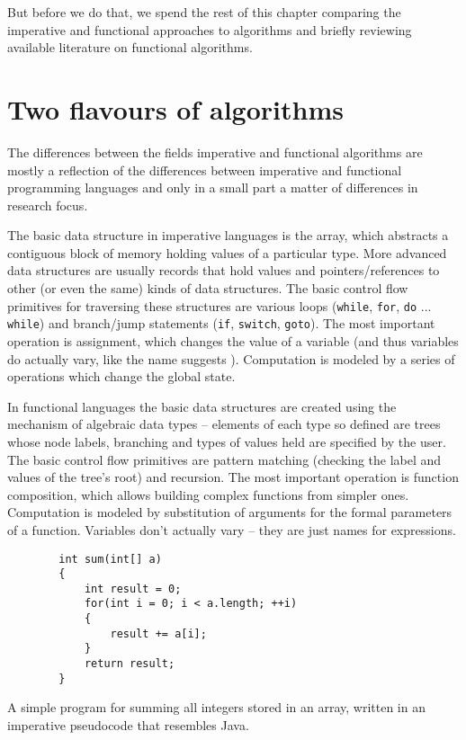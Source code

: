 \documentclass[declaration,mgr,english,shortabstract]{iithesis}
\newcommand{\m}[1]{\texttt{#1}}
\begin{document}
But before we do that, we spend the rest of this chapter comparing the imperative and functional approaches to algorithms and briefly reviewing available literature on functional algorithms.

\section{Two flavours of algorithms} \label{impfun}

The differences between the fields imperative and functional algorithms are mostly a reflection of the differences between imperative and functional programming languages and only in a small part a matter of differences in research focus.

The basic data structure in imperative languages is the array, which abstracts a contiguous block of memory holding values of a particular type. More advanced data structures are usually records that hold values and pointers/references to other (or even the same) kinds of data structures. The basic control flow primitives for traversing these structures are various loops (\m{while}, \m{for}, \m{do} ... \m{while}) and branch/jump statements (\m{if}, \m{switch}, \m{goto}). The most important operation is assignment, which changes the value of a variable (and thus variables do actually vary, like the name suggests \cite{WordsMatter}). Computation is modeled by a series of operations which change the global state.

In functional languages the basic data structures are created using the mechanism of algebraic data types -- elements of each type so defined are trees whose node labels, branching and types of values held are specified by the user. The basic control flow primitives are pattern matching (checking the label and values of the tree's root) and recursion. The most important operation is function composition, which allows building complex functions from simpler ones. Computation is modeled by substitution of arguments for the formal parameters of a function. Variables don't actually vary -- they are just names for expressions. \cite{WordsMatter}

\begin{listing}[H]
    \begin{verbatim}
        int sum(int[] a)
        {
            int result = 0;
            for(int i = 0; i < a.length; ++i)
            {
                result += a[i];
            }
            return result;
        }
    \end{verbatim}
    \caption{A simple program for summing all integers stored in an array, written in an imperative pseudocode that resembles Java.}
\end{listing}
\end{document}
